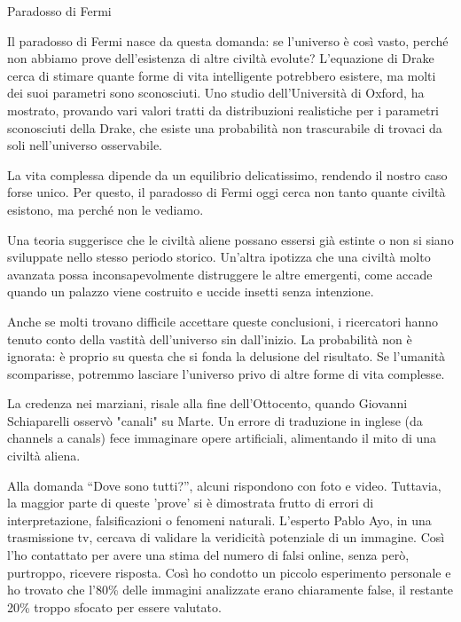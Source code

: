 \documentclass[12pt]{book} %
\begin{document}
\begin{mdframed}[linewidth=1pt]
Paradosso di Fermi

Il paradosso di Fermi nasce da questa domanda: se l’universo è così vasto, perché non abbiamo prove dell’esistenza di altre civiltà evolute? L’equazione di Drake cerca di stimare quante forme di vita intelligente potrebbero esistere, ma molti dei suoi parametri sono sconosciuti. Uno studio dell’Università di Oxford, ha mostrato, provando vari valori tratti da distribuzioni realistiche per i parametri sconosciuti della Drake, che esiste una probabilità non trascurabile di trovaci da soli nell’universo osservabile.

La vita complessa dipende da un equilibrio delicatissimo, rendendo il nostro caso forse unico. Per questo, il paradosso di Fermi oggi cerca non tanto quante civiltà esistono, ma perché non le vediamo.

Una teoria suggerisce che le civiltà aliene possano essersi già estinte o non si siano sviluppate nello stesso periodo storico. Un’altra ipotizza che una civiltà molto avanzata possa inconsapevolmente distruggere le altre emergenti, come accade quando un palazzo viene costruito e uccide insetti senza intenzione.

Anche se molti trovano difficile accettare queste conclusioni, i ricercatori hanno tenuto conto della vastità dell’universo sin dall’inizio. La probabilità non è ignorata: è proprio su questa che si fonda la delusione del risultato. Se l’umanità scomparisse, potremmo lasciare l’universo privo di altre forme di vita complesse.

La credenza nei marziani, risale alla fine dell’Ottocento, quando Giovanni Schiaparelli osservò "canali" su Marte. Un errore di traduzione in inglese (da channels a canals) fece immaginare opere artificiali, alimentando il mito di una civiltà aliena.

Alla domanda “Dove sono tutti?”, alcuni rispondono con foto e video. Tuttavia, la maggior parte di queste 'prove' si è dimostrata frutto di errori di interpretazione, falsificazioni o fenomeni naturali. L’esperto Pablo Ayo, in una trasmissione tv, cercava di validare la veridicità potenziale di un immagine. Così l'ho contattato per avere una stima del numero di falsi online, senza però, purtroppo, ricevere risposta. Così ho condotto un piccolo esperimento personale e ho trovato che l’80\% delle immagini analizzate erano chiaramente false, il restante 20\% troppo sfocato per essere valutato.


\end{mdframed}
\end{document}
